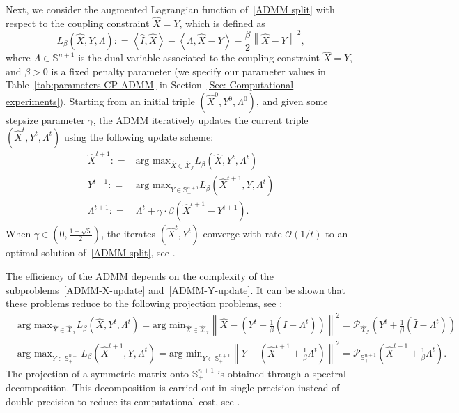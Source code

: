 \documentclass[11pt, a4paper]{article}
\newcommand{\IP}[2]{\left\langle #1, #2 \right\rangle}
\newcommand{\eqdef}{\mathrel{\mathop:}=}
\newcommand{\argmax}{\text{arg max}}
\newcommand{\argmin}{\text{arg min}}
\newcommand\norm[1]{\left\lVert#1\right\rVert}
\newcommand{\mc}{\mathcal}
\newcommand{\aug}[1]{\hat{#1}}
\begin{document}
Next, we consider the augmented Lagrangian function of~\eqref{ADMM split} with respect to the coupling constraint $\aug{X}=Y$, which is defined as
\begin{equation}
    L_{\beta}(\aug{X}, Y, \Lambda) \eqdef \IP{\aug{I}}{\aug{X}} - \IP{\Lambda}{\aug{X}-Y} - \frac{\beta}{2}\norm{\aug{X}-Y}^2, \label{ADMM augmented Lagrangian}
\end{equation}
where $\Lambda \in \mathbb{S}^{n+1}$ is the dual variable associated to the coupling constraint $\aug{X}=Y$, and $\beta > 0$ is a fixed penalty parameter (we specify our parameter values in Table~\ref{tab:parameters CP-ADMM} in Section~\ref{Sec: Computational experiments}). 
Starting from an initial triple $(\aug{X}^0, Y^0, \Lambda^0)$, and given some stepsize parameter $\gamma$, the ADMM iteratively updates the current triple $(\aug{X}^t, Y^t, \Lambda^t)$ using the following update scheme:
\begin{align}
    \aug{X}^{t+1} \eqdef& \argmax_{\aug{X} \in \aug{\mc{X}}_\mc{I}} L_\beta(\aug{X}, Y^t, \Lambda^t) \label{ADMM-X-update}\\
    Y^{t+1} \eqdef& \argmax_{Y \in \mathbb{S}_+^{n+1}} L_\beta(\aug{X}^{t+1}, Y, \Lambda^{t})\label{ADMM-Y-update}\\
    \Lambda^{t+1} \eqdef& \Lambda^t + \gamma \cdot \beta (\aug{X}^{t+1}-Y^{t+1}). \label{ADMM-L-update}
\end{align}
When $\gamma \in (0, \frac{1+\sqrt{5}}{2})$, the iterates $(\aug{X}^t, Y^t)$ converge with rate $\mc{O}(1/t)$ to an optimal solution of~\eqref{ADMM split}, see \cite{He2016ConvergenceSymmetricADMM}.

The efficiency of the ADMM depends on the complexity of the subproblems~\eqref{ADMM-X-update} and~\eqref{ADMM-Y-update}.
It can be shown that these problems reduce to the following projection problems, see \cite{Oliveira2018ADMMForQAP}:
\begin{align}
    &\argmax_{\aug{X} \in \aug{\mc{X}}_\mc{I}} L_\beta(\aug{X}, Y^t, \Lambda^t) 
    = \argmin_{\aug{X} \in \aug{\mc{X}}_\mc{I}} \norm{\aug{X}-\left(Y^t+\frac{1}{\beta}\left(\aug{I} - \Lambda^t\right)\right)}^2
    = \mc{P}_{\aug{\mc{X}}_\mc{I}}\left(Y^t + \frac{1}{\beta}\left(\aug{I} - \Lambda^t\right)\right) \label{ADMM-X-projection}\\
    &\argmax_{Y \in \mathbb{S}^{n+1}_+} L_\beta(\aug{X}^{t+1}, Y, \Lambda^t) = \argmin_{Y \in \mathbb{S}^{n+1}_+} \norm{Y- \left(\aug{X}^{t+1} + \frac{1}{\beta}\Lambda^t\right)}^2 = \mc{P}_{\mathbb{S}^{n+1}_+}\left(\aug{X}^{t+1} + \frac{1}{\beta}\Lambda^t\right).\label{ADMM-Y-projection}
\end{align}
The projection of a symmetric matrix onto $\mathbb{S}^{n+1}_+$ is obtained through a spectral decomposition. 
This decomposition is carried out in single precision instead of double precision to reduce its computational cost, see \cite{Sinjorgo2025ADMMStability}.
\end{document}
